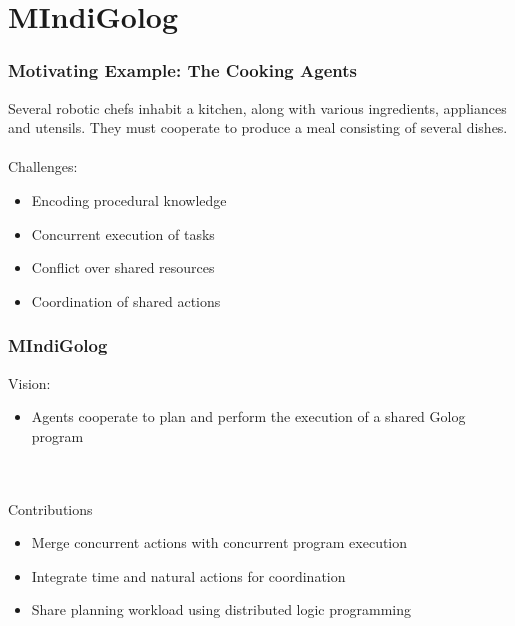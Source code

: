 \documentclass{beamer}
\begin{document}
\section{MIndiGolog}

\begin{frame}
\frametitle{Motivating Example: The Cooking Agents}
Several robotic chefs inhabit a kitchen, along with various ingredients,
appliances and utensils.  They must cooperate to produce a meal consisting
of several dishes.\\
\ \\
\pause
Challenges:
\begin{itemize}
  \item Encoding procedural knowledge
  \item Concurrent execution of tasks
  \item Conflict over shared resources
  \item Coordination of shared actions
\end{itemize}
\end{frame}


\begin{frame}
\frametitle{MIndiGolog}
Vision:
\begin{itemize}
\item Agents cooperate to plan and perform the execution of a shared Golog program
\end{itemize}
\ \\
\ \\
Contributions
\begin{itemize}
\item Merge concurrent actions with concurrent program execution
\item Integrate time and natural actions for coordination
\item Share planning workload using distributed logic programming
\end{itemize}
\end{frame}
\end{document}
